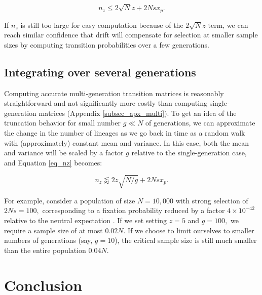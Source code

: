 \documentclass[review]{elsarticle}
\begin{document}
\begin{equation*}
  n_z \leq 2 \sqrt{N} z + 2Nsx_p.
\end{equation*}

If $n_z$ is still too large for easy computation because of the $2 \sqrt{N} z$ term, we 
can reach similar confidence that drift will compensate for selection at smaller sample sizes
by computing transition probabilities over a few generations. 

\subsection{Integrating over several generations} 

Computing accurate multi-generation transition matrices is reasonably straightforward 
and not significantly more costly than computing single-generation matrices 
(Appendix \ref{subsec_apx_multi}). To get an idea of the truncation behavior 
for small number $g \ll N$ of generations, we can approximate the change  in the number 
of lineages as we go back in time as a random walk with (approximately) constant mean and 
variance. In this case, both the mean and variance will be scaled by a factor $g$ relative 
to the single-generation case, and Equation \eqref{eq_nz} becomes:

\begin{equation}
  n_z \lessapprox 2 z\sqrt{N/g} + 2N s x_p.
\label{eq_nzg}
\end{equation}

For example, consider a population of size $N=10,000$ with strong selection
of $2Ns = 100,$ corresponding to a fixation probability reduced by a factor $4\times 10^{-42}$ relative 
to the neutral expectation \cite{Kimura:1962um}.  If we set setting $z=5$ and $g=100,$ we require a sample size of at most $0.02 N.$
 If we choose to limit ourselves to smaller numbers of generations (say, $g=10$), the critical sample 
 size is still much smaller than the entire population $0.04N$.
 
 
\section{Conclusion}
\label{sec_conclusion}

\end{document}
